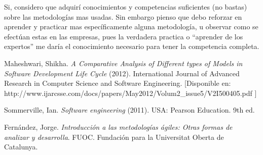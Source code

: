 \documentclass[spanish,12pt,letterpapper]{article}
\begin{document}
	Si, considero que adquirí conocimientos y competencias suficientes (no bastas) sobre las metodologías mas usadas. Sin embargo pienso que debo reforzar en aprender y practicar mas específicamente alguna metodología, u observar como se efectúan estas en las empresas, pues la verdadera practica o ``aprender de los expertos'' me daría el conocimiento necesario para tener la competencia completa. 
	
	\pagebreak
	\begin{thebibliography}{9}
	  Maheshwari, Shikha. 
		\emph{A Comparative Analysis of Different types of Models in Software Development Life Cycle} (2012). International Journal of Advanced Research in Computer Science and Software Engineering. [Disponible en: http://www.ijarcsse.com/docs/papers/May2012/Volum2\_issue5/V2I500405.pdf ]
		
		  Sommerville, Ian. 
		\emph{Software engineering} (2011). USA:  Pearson Education. 9th ed. 
		
		  Fernández, Jorge. 
		\emph{Introducción a las metodologías ágiles: Otras formas de analizar y desarrolla}. FUOC. Fundación para la Universitat Oberta de Catalunya. 
		
	\end{thebibliography}
	
\end{document}

